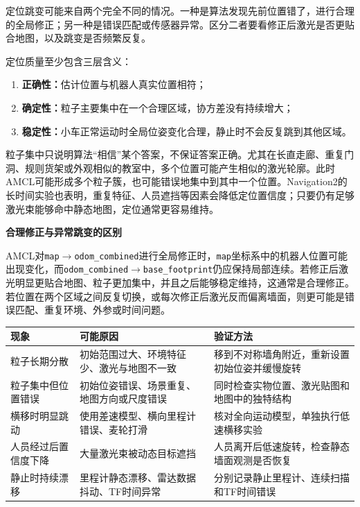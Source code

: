 \documentclass[UTF8,zihao=-4]{ctexart}
\DeclareRobustCommand{\code}[1]{\texttt{#1}}
\begin{document}
定位跳变可能来自两个完全不同的情况。一种是算法发现先前位置错了，进行合理的全局修正；另一种是错误匹配或传感器异常。区分二者要看修正后激光是否更贴合地图，以及跳变是否频繁反复。

定位质量至少包含三层含义：

\begin{enumerate}
  \item \textbf{正确性：}估计位置与机器人真实位置相符；
  \item \textbf{确定性：}粒子主要集中在一个合理区域，协方差没有持续增大；
  \item \textbf{稳定性：}小车正常运动时全局位姿变化合理，静止时不会反复跳到其他区域。
\end{enumerate}

粒子集中只说明算法“相信”某个答案，不保证答案正确。尤其在长直走廊、重复门洞、规则货架或外观相似的教室中，多个位置可能产生相似的激光轮廓。此时AMCL可能形成多个粒子簇，也可能错误地集中到其中一个位置。Navigation2的长时间实验也表明，重复特征、人员遮挡等因素会降低定位置信度；只要仍有足够激光束能够命中静态地图，定位通常更容易维持。

\textbf{合理修正与异常跳变的区别}

AMCL对\code{map}$\rightarrow$\code{odom\_combined}进行全局修正时，\code{map}坐标系中的机器人位置可能出现变化，而\code{odom\_combined}$\rightarrow$\code{base\_footprint}仍应保持局部连续。若修正后激光明显更贴合地图、粒子更加集中，并且之后能够稳定维持，这通常是合理修正。若位置在两个区域之间反复切换，或每次修正后激光反而偏离墙面，则更可能是错误匹配、重复环境、外参或时间问题。

\begin{table}[H]
\centering
\begin{tabular}{|p{}|p{}|p{}|}
\hline
\textbf{现象} & \textbf{可能原因} & \textbf{验证方法} \\
\hline
粒子长期分散 & 初始范围过大、环境特征少、激光与地图不一致 & 移到不对称墙角附近，重新设置初始位姿并缓慢旋转 \\
\hline
粒子集中但位置错误 & 初始位姿错误、场景重复、地图方向或尺度错误 & 同时检查实物位置、激光贴图和地图中的独特结构 \\
\hline
横移时明显跳动 & 使用差速模型、横向里程计错误、麦轮打滑 & 核对全向运动模型，单独执行低速横移实验 \\
\hline
人员经过后置信度下降 & 大量激光束被动态目标遮挡 & 人员离开后低速旋转，检查静态墙面观测是否恢复 \\
\hline
静止时持续漂移 & 里程计静态漂移、雷达数据抖动、TF时间异常 & 分别记录静止里程计、连续扫描和TF时间错误 \\
\hline
\end{tabular}
\end{table}
\end{document}
